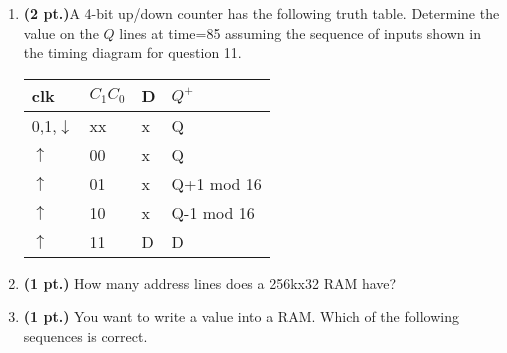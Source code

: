 \documentclass{article}
\begin{document}
\begin{enumerate}
\item {\bf (2 pt.)}A 4-bit up/down counter has the 
following truth table.  Determine the value on the $Q$ lines 
at time=85 assuming the sequence of inputs shown in the 
timing diagram for question 11. 

\begin{tabular}{l|l|l||l}
clk		& $C_1 C_0$	& D & $Q^+$	\\ \hline
0,1,$\downarrow$& xx		& x & Q		\\ \hline
$\uparrow$ 	& 00		& x & Q		\\  \hline
$\uparrow$ 	& 01		& x & Q+1 mod 16\\  \hline
$\uparrow$ 	& 10		& x & Q-1 mod 16\\  \hline
$\uparrow$ 	& 11		& D & D		\\
\end{tabular}


\pagebreak
\item {\bf (1 pt.)} How many address lines does a 256kx32 RAM have?

\item {\bf (1 pt.)} You want to write a value into a RAM.
Which of the following sequences is correct.


\end{enumerate}
\end{document}
